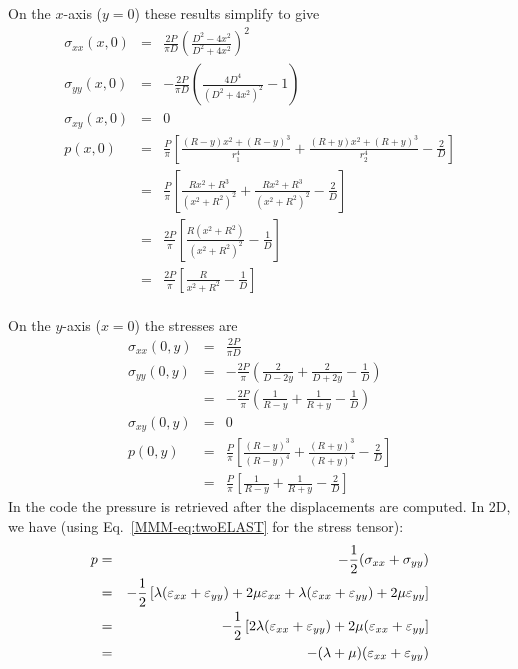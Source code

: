 On the $x$-axis ($y=0$) these results simplify to give
\begin{eqnarray}
\sigma_{xx}(x,0) &=& \frac{2P}{\pi D} \left( \frac{D^2-4x^2}{D^2+4x^2}  \right)^2 \\
\sigma_{yy}(x,0) &=& -\frac{2P}{\pi D} \left( \frac{4D^4}{(D^2+4x^2)^2} -1 \right) \\
\sigma_{xy}(x,0) &=& 0 \\
p(x,0) 
&=& \frac{P}{\pi} \left[ \frac{(R-y)x^2 + (R-y)^3 }{r_1^4} + \frac{(R+y)x^2 + (R+y)^3  }{r_2^4}  - \frac{2}{D} \right] \\
&=& \frac{P}{\pi} \left[ \frac{Rx^2 + R^3 }{(x^2+R^2)^2} + \frac{Rx^2 + R^3  }{(x^2+R^2)^2}  - \frac{2}{D} \right] \\
&=& \frac{2P}{\pi} \left[ \frac{R(x^2 + R^2 )}{(x^2+R^2)^2} - \frac{1}{D} \right] \\
&=& \frac{2P}{\pi} \left[ \frac{R }{x^2+R^2} - \frac{1}{D} \right] \\
\end{eqnarray}

On the $y$-axis ($x=0$) the stresses are 
\begin{eqnarray}
\sigma_{xx}(0,y) &=& \frac{2P}{\pi D} \\
\sigma_{yy}(0,y) 
&=& -\frac{2P}{\pi} \left( \frac{2}{D-2y} + \frac{2}{D+2y} -\frac{1}{D} \right) \\
&=& -\frac{2P}{\pi} \left( \frac{1}{R-y} + \frac{1}{R+y} -\frac{1}{D} \right) \\
\sigma_{xy} (0,y) &=& 0 \\
p(0,y) 
&=& \frac{P}{\pi} \left[ \frac{(R-y)^3 }{(R-y)^4} + \frac{ (R+y)^3  }{(R+y)^4}  - \frac{2}{D} \right] \\
&=& \frac{P}{\pi} \left[ \frac{1}{R-y} + \frac{ 1 }{R+y}  - \frac{2}{D} \right] 
\end{eqnarray}
In the code the pressure is retrieved after the displacements are computed. 
In 2D, we have (using Eq.~\ref{MMM-eq:twoELAST} for the stress tensor):
\begin{eqnarray}
p
&=& -\frac{1}{2}(\sigma_{xx} + \sigma_{yy}) \nonumber\\
&=& -\frac{1}{2} \left[
\lambda (\varepsilon_{xx}+\varepsilon_{yy}) + 2 \mu \varepsilon_{xx} +
\lambda (\varepsilon_{xx}+\varepsilon_{yy}) + 2 \mu \varepsilon_{yy} 
\right] \\
&=& -\frac{1}{2} \left[
2\lambda (\varepsilon_{xx}+\varepsilon_{yy}) + 2 \mu (\varepsilon_{xx} + \varepsilon_{yy} \right]\nonumber\\
&=& -(\lambda+\mu) (\varepsilon_{xx}+\varepsilon_{yy}) 
\end{eqnarray}


